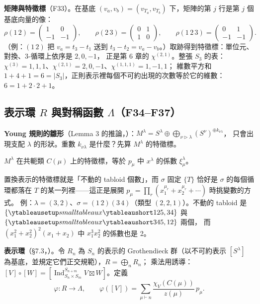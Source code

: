 \textbf{矩陣與特徵標}（F33）。在基底 $(v_a,v_b)=(v_{T_a},v_{T_b})$ 下，矩陣的第 $j$ 行是第 $j$ 個基底向量的像：
\[
\rho(1\,2)=\begin{pmatrix}1&0\\-1&-1\end{pmatrix},\qquad
\rho(2\,3)=\begin{pmatrix}0&1\\1&0\end{pmatrix},\qquad
\rho(1\,2\,3)=\begin{pmatrix}0&1\\-1&-1\end{pmatrix}.
\]
（例：$(1\,2)$ 把 $v_a=t_3-t_1$ 送到 $t_3-t_2=v_a-v_b$。）取跡得到特徵標：單位元、對換、3-循環上依序是 $2,0,-1$，
正是第 6 章的 $\chi^{(2,1)}$。整張 $S_3$ 的表：$\chi^{(3)}=1,1,1$、$\chi^{(2,1)}=2,0,-1$、$\chi^{(1,1,1)}=1,-1,1$；
維數平方和 $1+4+1=6=|S_3|$，正則表示裡每個不可約出現的次數等於它的維數：$6=1+2\cdot2+1$。

\subsection{表示環 $R$ 與對稱函數 $\Lambda$（F34--F37）}\label{sec:f-ring}

\textbf{Young 規則的雛形}（Lemma 3 的推論，）：$M^\lambda=S^\lambda\oplus\bigoplus_{\nu\triangleright\lambda}(S^\nu)^{\oplus k_{\nu\lambda}}$，
只會出現支配 $\lambda$ 的形狀。重數 $k_{\nu\lambda}$ 是什麼？先算 $M^\lambda$ 的特徵標。

\begin{thmbox}
$M^\lambda$ 在共軛類 $C(\mu)$ 上的特徵標，等於 $p_\mu$ 中 $x^\lambda$ 的係數 $\xi^\lambda_\mu$。
\end{thmbox}
置換表示的特徵標就是「不動的 tabloid 個數」，而 $\sigma$ 固定 $\{T\}$ 恰好是 $\sigma$ 的每個循環都落在 $T$ 的某一列裡——這正是展開 $p_\mu=\prod_r(x_1^{\mu_r}+x_2^{\mu_r}+\cdots)$ 時挑變數的方式。
例：$\lambda=(3,2)$、$\sigma=(1\,2)(3\,4)$（類型 $(2,2,1)$）。不動的 tabloid 是 $\{\yts{125,34}\}$ 與 $\{\yts{345,12}\}$ 兩個，
而 $(x_1^2+x_2^2)^2(x_1+x_2)$ 中 $x_1^3x_2^2$ 的係數也是 2。

\textbf{表示環}（\S7.3，）。令 $R_n$ 為 $S_n$ 的表示的 Grothendieck 群（以不可約表示 $[S^\lambda]$ 為基底，並規定它們正交規範），$R=\bigoplus_n R_n$；
乘法用誘導：$[V]\circ[W]=[\operatorname{Ind}_{S_n\times S_m}^{S_{n+m}}V\boxtimes W]$。定義
\[
\varphi:R\to\Lambda,\qquad \varphi([V])=\sum_{\mu\vdash n}\frac{\chi_V(C(\mu))}{z(\mu)}\,p_\mu .
\]

